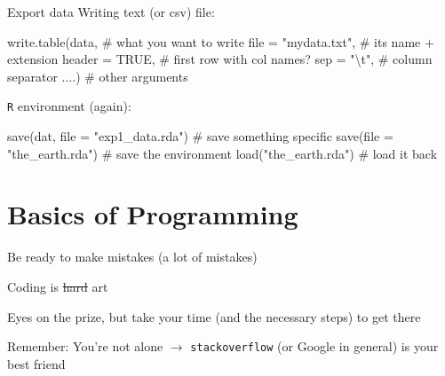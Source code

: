 \documentclass[
  ignorenonframetext,
]{beamer}
\newenvironment{Shaded}{\begin{snugshade}}{\end{snugshade}}
\newcommand{\AttributeTok}[1]{\textcolor[rgb]{0.00,0.34,0.68}{#1}}
\newcommand{\CommentTok}[1]{\textcolor[rgb]{0.54,0.53,0.53}{#1}}
\newcommand{\ConstantTok}[1]{\textcolor[rgb]{0.67,0.33,0.00}{#1}}
\newcommand{\FunctionTok}[1]{\textcolor[rgb]{0.39,0.29,0.61}{#1}}
\newcommand{\NormalTok}[1]{\textcolor[rgb]{0.12,0.11,0.11}{#1}}
\newcommand{\SpecialCharTok}[1]{\textcolor[rgb]{0.24,0.68,0.91}{#1}}
\newcommand{\StringTok}[1]{\textcolor[rgb]{0.75,0.01,0.01}{#1}}
\begin{document}
\begin{frame}[fragile]{Export data}
\protect\hypertarget{export-data}{}
Writing text (or csv) file:

\begin{Shaded}
\begin{Highlighting}[]
\FunctionTok{write.table}\NormalTok{(data, }\CommentTok{\# what you want to write }
            \AttributeTok{file =} \StringTok{"mydata.txt"}\NormalTok{, }\CommentTok{\# its name + extension}
            \AttributeTok{header =} \ConstantTok{TRUE}\NormalTok{, }\CommentTok{\# first row with col names?}
            \AttributeTok{sep =} \StringTok{"}\SpecialCharTok{\textbackslash{}t}\StringTok{"}\NormalTok{,  }\CommentTok{\# column separator }
\NormalTok{            ....) }\CommentTok{\# other arguments}
\end{Highlighting}
\end{Shaded}

\texttt{R} environment (again):

\begin{Shaded}
\begin{Highlighting}[]
\FunctionTok{save}\NormalTok{(dat, }\AttributeTok{file =} \StringTok{"exp1\_data.rda"}\NormalTok{) }\CommentTok{\# save something specific }
\FunctionTok{save}\NormalTok{(}\AttributeTok{file =} \StringTok{"the\_earth.rda"}\NormalTok{)      }\CommentTok{\# save the environment}
\FunctionTok{load}\NormalTok{(}\StringTok{"the\_earth.rda"}\NormalTok{)             }\CommentTok{\# load it back}
\end{Highlighting}
\end{Shaded}
\end{frame}

\hypertarget{basics-of-programming}{%
\section{Basics of Programming}\label{basics-of-programming}}

\begin{frame}[fragile]{}
\protect\hypertarget{section-5}{}
Be ready to make mistakes (a lot of mistakes)

Coding is \st{hard} art

Eyes on the prize, but take your time (and the necessary steps) to get
there

Remember: You're not alone \(\rightarrow\) \texttt{stackoverflow} (or
Google in general) is your best friend
\end{frame}
\end{document}
